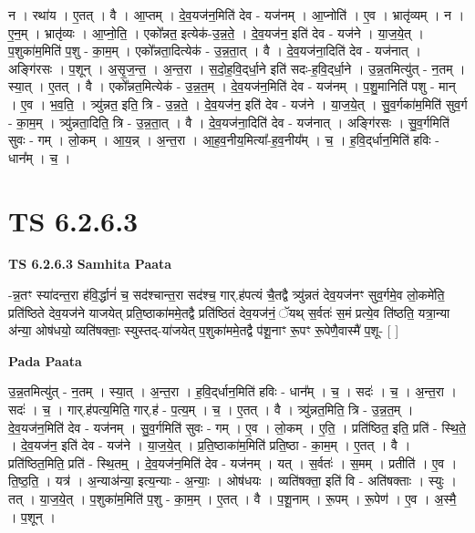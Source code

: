 \documentclass[17pt]{extarticle}
\begin{document}
न । रथा॑य । ए॒तत् । वै । आ॒प्तम् । दे॒व॒यज॑न॒मिति॑ देव - यज॑नम् । आ॒प्नोति॑ । ए॒व । भ्रातृ॑व्यम् । न । ए॒न॒म् । भ्रातृ॑व्यः । आ॒प्नो॒ति॒ । एको᳚न्नत॒ इत्येक॑-उ॒न्न॒ते॒ । दे॒व॒यज॑न॒ इति॑ देव - यज॑ने । या॒ज॒ये॒त् । प॒शुका॑म॒मिति॑ प॒शु - का॒म॒म् । एको᳚न्नता॒दित्येक॑ - उ॒न्न॒ता॒त् । वै । दे॒व॒यज॑ना॒दिति॑ देव - यज॑नात् । अङ्गि॑रसः । प॒शून् । अ॒सृ॒ज॒न्त॒ । अ॒न्त॒रा । स॒दो॒ह॒वि॒द्‌र्धा॒ने इति॑ सदः-ह॒वि॒द्‌र्धा॒ने । उ॒न्न॒तमित्यु॑त् - न॒तम् । स्या॒त् । ए॒तत् । वै । एको᳚न्नत॒मित्येक॑ - उ॒न्न॒त॒म् । दे॒व॒यज॑न॒मिति॑ देव - यज॑नम् । प॒शु॒मानिति॑ पशु - मान् । ए॒व । भ॒व॒ति॒ । त्र्यु॑न्नत॒ इति॒ त्रि - उ॒न्न॒ते॒ । दे॒व॒यज॑न॒ इति॑ देव - यज॑ने । या॒ज॒ये॒त् । सु॒व॒र्गका॑म॒मिति॑ सुव॒र्ग - का॒म॒म् । त्र्यु॑न्नता॒दिति॒ त्रि - उ॒न्न॒ता॒त् । वै । दे॒व॒यज॑ना॒दिति॑ देव - यज॑नात् । अङ्गि॑रसः । सु॒व॒र्गमिति॑ सुवः - गम् । लो॒कम् । आ॒य॒न्न् । अ॒न्त॒रा । आ॒ह॒व॒नीय॒मित्या᳚-ह॒व॒नीय᳚म् । च॒ । ह॒वि॒द्‌र्धान॒मिति॑ हविः - धान᳚म् । च॒ ।  \newline




\section*{ TS 6.2.6.3 }

\textbf{TS 6.2.6.3 } \newline
\textbf{Samhita Paata} \newline

-न्न॒तꣳ स्या॑दन्त॒रा ह॑वि॒र्द्धानं॑ च॒ सद॑श्चान्त॒रा सद॑श्च॒ गार्.ह॑पत्यं चै॒तद्वै त्र्यु॑न्नतं देव॒यज॑नꣳ सुव॒र्गमे॒व लो॒कमे॑ति॒ प्रति॑ष्ठिते देव॒यज॑ने याजयेत् प्रति॒ष्ठाका॑ममे॒तद्वै प्रति॑ष्ठितं देव॒यज॑नं॒ ॅयथ् स॒र्वतः॑ स॒मं प्रत्ये॒व ति॑ष्ठति॒ यत्रा॒न्या अ॑न्या॒ ओष॑धयो॒ व्यति॑षक्ताः॒ स्युस्तद्-या॑जयेत् प॒शुका॑ममे॒तद्वै प॑शू॒नाꣳ रू॒पꣳ रू॒पेणै॒वास्मै॑ प॒शू- [  ] \newline

\textbf{Pada Paata} \newline

उ॒न्न॒तमित्यु॑त् - न॒तम् । स्या॒त् । अ॒न्त॒रा । ह॒वि॒द्‌र्धान॒मिति॑ हविः - धान᳚म् । च॒ । सदः॑ । च॒ । अ॒न्त॒रा । सदः॑ । च॒ । गार्.ह॑पत्य॒मिति॒ गार्.ह॑ - प॒त्य॒म् । च॒ । ए॒तत् । वै । त्र्यु॑न्नत॒मिति॒ त्रि - उ॒न्न॒त॒म् । दे॒व॒यज॑न॒मिति॑ देव - यज॑नम् । सु॒व॒र्गमिति॑ सुवः - गम् । ए॒व । लो॒कम् । ए॒ति॒ । प्रति॑ष्ठित॒ इति॒ प्रति॑ - स्थि॒ते॒ । दे॒व॒यज॑न॒ इति॑ देव - यज॑ने । या॒ज॒ये॒त् । प्र॒ति॒ष्ठाका॑म॒मिति॑ प्रति॒ष्ठा - का॒म॒म् । ए॒तत् । वै । प्रति॑ष्ठित॒मिति॒ प्रति॑ - स्थि॒तम्॒ । दे॒व॒यज॑न॒मिति॑ देव - यज॑नम् । यत् । स॒र्वतः॑ । स॒मम् । प्रतीति॑ । ए॒व । ति॒ष्ठ॒ति॒ । यत्र॑ । अ॒न्या‌अ॑न्या॒ इत्य॒न्याः - अ॒न्याः॒ । ओष॑धयः । व्यति॑षक्ता॒ इति॑ वि - अति॑षक्ताः । स्युः । तत् । या॒ज॒ये॒त् । प॒शुका॑म॒मिति॑ प॒शु - का॒म॒म् । ए॒तत् । वै । प॒शू॒नाम् । रू॒पम् । रू॒पेण॑ । ए॒व । अ॒स्मै॒ । प॒शून् ।  \newline
\end{document}
